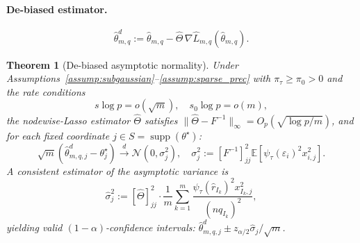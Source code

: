 \documentclass[10pt]{article}
\newtheorem{theorem}{Theorem}[section]
\newcommand{\E}{\mathbb{E}}
\newcommand{\hL}{\hat{L}}
\newcommand{\hth}{\hat{\theta}}
\newcommand{\ts}{\theta^{\star}}
\newcommand{\hTh}{\hat{\Theta}}
\newcommand{\Op}{O_p}
\begin{document}
\paragraph{De-biased estimator.}
\begin{equation}\label{eq:debiased}
  \hth^d_{m,q} := \hth_{m,q} - \hTh\,\nabla\hL_{m,q}(\hth_{m,q}).
\end{equation}

\begin{theorem}[De-biased asymptotic normality]\label{thm:debiased}
Under Assumptions~\ref{assump:subgaussian}--\ref{assump:sparse_prec}
with $\pi_\tau\ge\pi_0>0$ and the rate conditions
\begin{equation}\label{eq:rate_cond}
  s\log p=o(\sqrt{m}),\quad s_0\log p=o(m),
\end{equation}
the nodewise-Lasso estimator $\hTh$ satisfies
$\|\hTh-F^{-1}\|_\infty=\Op(\sqrt{\log p/m})$,
and for each fixed coordinate $j\in S=\operatorname{supp}(\ts)$:
\begin{equation}\label{eq:clt}
  \sqrt{m}(\hth^d_{m,q,j}-\ts_j)
  \xrightarrow{d}\mathcal{N}(0,\sigma_j^2),\quad
  \sigma_j^2:=[F^{-1}]_{jj}^2\E[\psi_\tau(\varepsilon_i)^2x_{i,j}^2].
\end{equation}
A consistent estimator of the asymptotic variance is
\begin{equation}\label{eq:var_est}
  \hat\sigma_j^2 :=
  [\hTh]_{jj}^2\cdot
  \frac{1}{m}\sum_{k=1}^m
  \frac{\psi_\tau(\hat r_{I_k})^2x_{I_k,j}^2}{(nq_{I_k})^2},
\end{equation}
yielding valid $(1-\alpha)$-confidence intervals:
$\hth^d_{m,q,j}\pm z_{\alpha/2}\hat\sigma_j/\sqrt{m}$.
\end{theorem}
\end{document}
